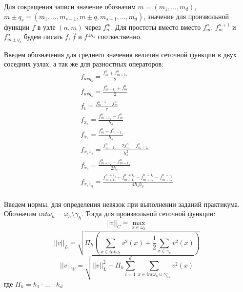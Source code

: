 Для сокращения записи значение обозначим $m=(m_1,\dots, m_d)$, $m \pm q_s = (m_1, \dots, m_{s-1}, m\pm q, m_{s+1}, \dots, m_d)$, значение для произвольной функции $f$ в узле $(n,m)$ через $f_n^m$. Для простоты вместо вместо $f_m^n$, $f_m^{n+1}$ и $f_{m \pm q_s}^n$ будем писать $f$, $\hat{f}$ и $f^{\pm q_s}$ соотвественно.

Введем обозначения для среднего значения величин сеточной функции в двух соседних узлах, а так же для разностных операторов:
\begin{equation}
	\begin{array}{lc}
		f_{avg_s} = \frac{f_m^n + f^n_{m + 1_s}}{2} \\
		f_{\overline{avg}_s} =  \frac{ f^n_{m - 1_s} + f_m^n}{2} \\
		f_t = \frac{f_m^{n+1} - f_m^n}{\tau}\\
		f_{x_s} = \frac{f_{m+1_s}^n - f^n_m}{h_s}\\
		f_{\bar{x}_s} = \frac{f_m^n - f^n_{m-1_s}}{h_s}\\
		f_{x_s\bar{x}_s} = \frac{f^n_{m-1_s} - 2f_m^n + f^n_{m+1_s}}{h_s^2}\\
		f_{\mathring{x}_s} = \frac{f_{m+1_s}^n - f^n_{m-1_s}}{2h_s}\\
		f_{\mathring{x}_s \mathring{x}_q} = \frac{f_{m+1_s}^{n \,\, +1_q} + f_{m-1_s}^{n \,\, +1_q} - f_{m+1_s}^{n \,\, -1_q} - f_{m-1_s}^{n \,\, -1_q}}{4h_sh_q}\\
	\end{array}
\end{equation}

Введем нормы, для определения невязок при выполнении заданий практикума. Обозначим $int\omega_h = \omega_h \setminus \gamma_h$. Тогда для произвольной сеточной функции:
$$||v||_C = \max_{x\in \omega_h}$$
$$||v||_L = \sqrt{\Pi_h \left(\sum_{x\in int\omega_h} v^2(x) + \frac{1}{2}\sum_{x\in \gamma_h} v^2(x)\right) }$$
$$||v||_W = \sqrt{||v||_L^2 + \Pi_h\sum_{i = 1}^{d}\sum_{x\in int\omega_h \cup \gamma_{h,i}^-} v^2(x)}$$
где $\Pi_h = h_1\cdot \, \dots \, \cdot h_d$

